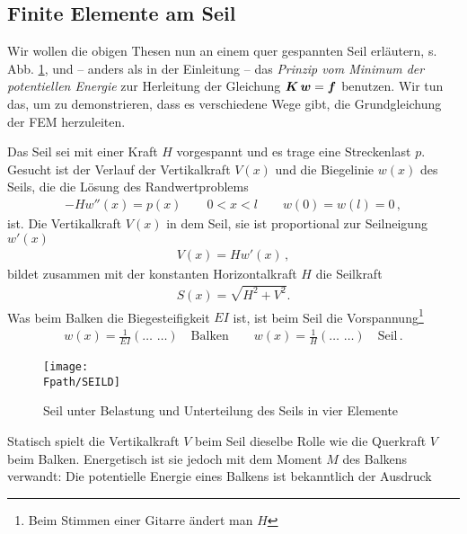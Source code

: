 {\textcolor{sectionTitleBlue}{\section{Finite Elemente am Seil}}}

Wir wollen die obigen Thesen nun an einem quer gespannten Seil erl\"{a}utern, s. Abb. \ref{Seil1}, und -- anders als in der Einleitung -- das {\em Prinzip vom Minimum der potentiellen Energie\/} zur Herleitung der Gleichung $\mbox{\boldmath $K$}\,\mbox{\boldmath $w$} = \mbox{\boldmath $f$}$ benutzen. Wir tun das, um zu demonstrieren, dass es verschiedene Wege gibt, die Grundgleichung der FEM herzuleiten.

Das Seil sei mit einer Kraft $H$ vorgespannt und es trage eine Streckenlast $p$. Gesucht ist der Verlauf der Vertikalkraft $V(x)$ und  die Biegelinie $w(x)$ des Seils, die die L\"{o}sung des Randwertproblems
\begin{align}
- H w''(x) = p(x) \qquad 0 < x < l\qquad w(0)= w(l) = 0 \,,
\end{align}
ist. Die Vertikalkraft $V(x)$ in dem Seil, sie ist proportional zur Seilneigung $w'(x)$
\begin{align}
V(x) = H w'(x) \,,
\end{align}
bildet zusammen mit der konstanten Horizontalkraft $H$ die  Seilkraft
\begin{align}
S(x) = \sqrt{H^2 + V^2}.
\end{align}
Was beim Balken die Biegesteifigkeit $EI$ ist, ist beim Seil die Vorspannung\footnote{Beim Stimmen einer Gitarre \"{a}ndert man $H$}
\begin{align}
w(x) = \frac{1}{EI} (\ldots \,\,\ldots)  \quad \text{Balken}  \qquad w(x) = \frac{1}{H} (\ldots \,\,\ldots)\quad \text{Seil}\,.
\end{align}
\begin{figure}[tbp] \centering
\if {} \sidecaption \fi
\texttt{[image: \\Fpath/SEILD]}
\caption{Seil unter Belastung und Unterteilung des Seils in vier Elemente} \label{Seil1}
\end{figure}%
Statisch spielt die Vertikalkraft $V$ beim Seil dieselbe Rolle wie die Querkraft $V$ beim Balken. Energetisch ist sie jedoch mit dem Moment $M$ des Balkens verwandt: Die potentielle Energie eines Balkens ist bekanntlich der Ausdruck
